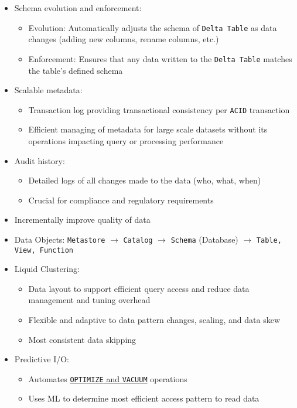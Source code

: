 \documentclass[11pt]{scrartcl}
\begin{document}
\begin{itemize}
\begin{itemize}
	\end{itemize}
	\item Schema evolution and enforcement:
	\begin{itemize}
		\item Evolution: Automatically adjusts the schema of \texttt{Delta Table} as data changes (adding new columns, rename columns, etc.)
		\item Enforcement: Ensures that any data written to the \texttt{Delta Table} matches the table’s defined schema
	\end{itemize}
	\item Scalable metadata:
	\begin{itemize}
		\item Transaction log providing transactional consistency per \texttt{ACID} transaction
		\item Efficient managing of metadata for large scale datasets without its operations impacting query or processing performance
	\end{itemize}
	\item Audit history:
	\begin{itemize}
		\item Detailed logs of all changes made to the data (who, what, when)
		\item Crucial for compliance and regulatory requirements
	\end{itemize}
	\item Incrementally improve quality of data
	\item Data Objects: \texttt{Metastore} $\to$ \texttt{Catalog} $\to$ \texttt{Schema} (Database) $\to$ \texttt{Table, View, Function}
	\item Liquid Clustering:
	\begin{itemize}
		\item Data layout to support efficient query access and reduce data management and tuning overhead
		\item Flexible and adaptive to data pattern changes, scaling, and data skew
		\item Most consistent data skipping
	\end{itemize}
	\item Predictive I/O:
	\begin{itemize}
		\item Automates \hyperref[performance_tuning_delta_lake]{\texttt{OPTIMIZE} and \texttt{VACUUM}} operations
		\item Uses ML to determine most efficient access pattern to read data
	\end{itemize}
\end{itemize}
\end{document}
